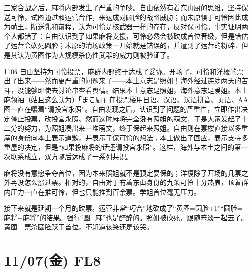 
三家合战之后，麻将内部发生了严重的争吵。自由依然有着东山厨的思维，坚持保送可怜，试图通过和运营合作，来达成对圆脸的战略威胁；而末原惧于可怜因此成为萌王，断送乳和前程，认为可怜是核武器一样的存在，反对保可怜。事实证明两个人都错了：自由认识到了如果麻将支援，可怜必然会被砍成首位晋级，但是错估了运营会砍死圆脸；末原的清场政策一开始就是错误的，并遭到了运营的粉碎，但是其认为黄图作为大规模杀伤性武器的威力则被验证了。

1106 自由坚持为可怜投票，麻群内部终于达成了妥协。开场了，可怜和洋榎的票出了出来——然而更严重的问题来了——本土意志是照姐！海外经过连续两天的苦斗，没能够即使去讨论串查看舆情。结果本土意志是照姐，海外意志是爱姐。本土麻领袖（姑且这么认为）「まこ厨」在投票楼用日语、汉语、汉语拼音、英语、AA图一直在嚷着“请投宫永照”。自由发现之后，认识到了问题的严重性，立即作出决定停止投票，改投宫永照。然而这时麻将完全没有照姐的萌文，于是大家发起了十二分的努力，为照姐凑出来一堆萌文，终于保起来照姐。自由则在票楼直接以多重屋的身份向本土表示道歉，并表示了保可怜的想法；本土做出了回应，表示支持多重屋的决定，但是“如果投麻将的话还请投宫永照”。这样，海外与本土之间的第一次联系成立，双方随后达成了一系列共识。

麻将没有意愿争夺首位，因为本来照姐就不是预定要保的；洋榎除了开场的几票之外再没怎么涨过票。相对的，自由对于有着东山身份的九条可怜十分热衷，顶着群内压力一直在推可怜，但也只能推到百余票。学姐首位毫无压力。

接下来就是延期一个月的砍票。运营非常“巧合”地砍成了“黄图=圆脸+1”“圆脸=麻将+麻将”的结果。强行“圆=麻”也是醉醉的。照姐被砍死，跟随笨淡一起去了。黄图一票杀圆脸跃于首位，不知道该笑还是该哭。

\section{11/07(金) FL8}

